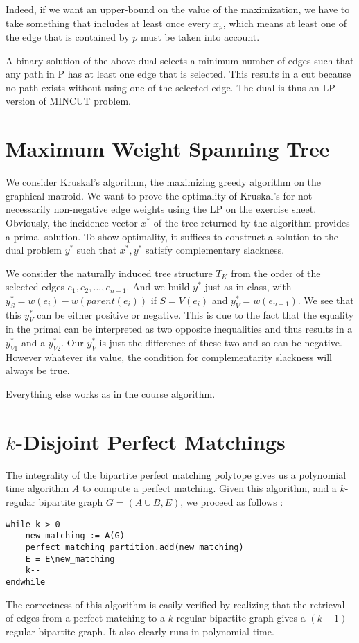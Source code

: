 \documentclass{scrartcl}
\newcommand\1{\mathbf{1}}
\begin{document}
Indeed, if we want an upper-bound on the value of the maximization, we have to take something that includes at least once every $x_p$, which means at least one of the edge that is contained by $p$ must be taken into account. 

A binary solution of the above dual selects a minimum number of edges such that any path in P has at least one edge that is selected. This results in a cut because no path exists without using one of the selected edge. The dual is thus an LP version of MINCUT problem.

\section{Maximum Weight Spanning Tree}
We consider Kruskal's algorithm, the maximizing greedy algorithm on the graphical matroid. We want to prove the optimality of Kruskal's for not necessarily non-negative edge weights using the LP on the exercise sheet. Obviously, the incidence vector $x^*$ of the tree returned by the algorithm provides a primal solution. To show optimality, it suffices to construct a solution to the dual problem $y^*$ such that $x^*,y^*$ satisfy complementary slackness.

We consider the naturally induced tree structure $T_K$ from the order of the selected edges ${e_1,e_2,...,e_{n-1}}$. And we build $y^*$ just as in class, with $y^*_S = w(e_i) - w(parent(e_i))$ if $S=V(e_i)$ and $y^*_V = w(e_{n-1})$. We see that this $y^*_V$ can be either positive or negative. This is due to the fact that the equality in the primal can be interpreted as two opposite inequalities and thus results in a $y^*_{V1}$ and a $y^*_{V2}$. Our $y^*_V$ is just the difference of these two and so can be negative. However whatever its value, the condition for complementarity slackness will always be true.

Everything else works as in the course algorithm.

\section{$k$-Disjoint Perfect Matchings}

The integrality of the bipartite perfect matching polytope gives us a polynomial time algorithm $A$ to compute a perfect matching. Given this algorithm, and a $k$-regular bipartite graph $G = (A \cup B,E)$, we proceed as follows :

\begin{verbatim}
while k > 0
    new_matching := A(G) 
    perfect_matching_partition.add(new_matching)
    E = E\new_matching
    k--
endwhile
\end{verbatim}

The correctness of this algorithm is easily verified by realizing that the retrieval of edges from a perfect matching to a $k$-regular bipartite graph gives a $(k-1)$-regular bipartite graph. It also clearly runs in polynomial time.
\end{document}
